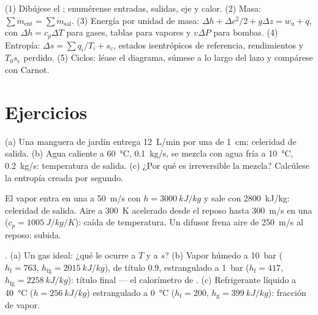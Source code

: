 \begin{method}\label{meth:b2:open-systems:method}
(1) Dibújese el ; enumérense entradas, salidas, eje y calor.
(2) Masa: $\sum\dot m_{\text{ent}} = \sum\dot m_{\text{sal}}$. (3) Energía
por unidad de masa: $\Delta h + \Delta c^2/2 + g\Delta z = w_{\text{u}} + q$, con
$\Delta h = c_p\Delta T$ para gases, tablas para vapores y $v\Delta P$ para
bombas. (4) Entropía: $\Delta s = \sum q_i/T_i + s_{\text{c}}$, estados
isentrópicos de referencia, rendimientos y $T_0s_{\text{c}}$ perdido. (5) Ciclos: léase
el diagrama, súmese a lo largo del lazo y compárese con Carnot.
\end{method}

\section{Ejercicios}

\begin{exercise}[$\star$]\label{exo:b2:open-systems:1}
(a) Una manguera de jardín entrega \qty{12}{L/min} por una  de \qty{1}{cm}:
celeridad de salida. (b) Agua caliente a \qty{60}{\celsius}, \qty{0.1}{kg/s},
se mezcla con agua fría a \qty{10}{\celsius}, \qty{0.2}{kg/s}: temperatura
de salida. (c) ¿Por qué es irreversible la mezcla? Calcúlese la
entropía creada por segundo.
\end{exercise}

\begin{exercise}[$\star$]\label{exo:b2:open-systems:2}
El vapor entra en una  a \qty{50}{m/s} con $h = \qty{3000}{kJ/kg}$ y
sale con \qty{2800}{kJ/kg}: celeridad de salida. Aire a \qty{300}{K} acelerado
desde el reposo hasta \qty{300}{m/s} en una  ($c_p = \qty{1005}{J/kg/K}$):
caída de temperatura. Un difusor frena aire de \qty{250}{m/s} al reposo: subida.
\end{exercise}

\begin{exercise}[$\star$]\label{exo:b2:open-systems:3}
. (a) Un gas ideal: ¿qué le ocurre a $T$ y a $s$? (b) Vapor húmedo
a \qty{10}{bar} ($h_{\text{f}} = 763$, $h_{\text{fg}} = \qty{2015}{kJ/kg}$),
de título $0.9$, estrangulado a \qty{1}{bar} ($h_{\text{f}} = 417$, $h_{\text{fg}}
= \qty{2258}{kJ/kg}$): título final --- el calorímetro de . (c)
Refrigerante líquido a \qty{40}{\celsius} ($h = \qty{256}{kJ/kg}$) estrangulado
a \qty{0}{\celsius} ($h_{\text{f}} = 200$, $h_{\text{g}} = \qty{399}{kJ/kg}$):
fracción de vapor.
\end{exercise}

